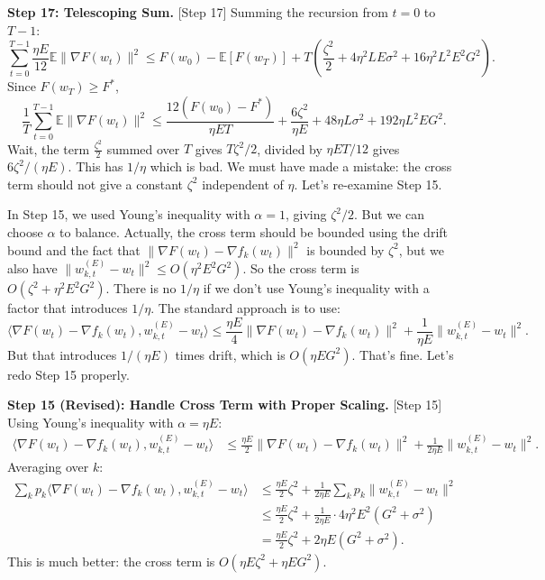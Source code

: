 \documentclass{article}
\begin{document}
\textbf{Step 17: Telescoping Sum.} [Step 17]
Summing the recursion from $t=0$ to $T-1$:
\begin{equation}
    \sum_{t=0}^{T-1} \frac{\eta E}{12} \mathbb{E} \| \nabla F(w_t) \|^2 \leq F(w_0) - \mathbb{E}[F(w_T)] + T \left( \frac{\zeta^2}{2} + 4 \eta^2 L E \sigma^2 + 16 \eta^2 L^2 E^2 G^2 \right).
\end{equation}
Since $F(w_T) \geq F^*$,
\begin{equation}
    \frac{1}{T} \sum_{t=0}^{T-1} \mathbb{E} \| \nabla F(w_t) \|^2 \leq \frac{12(F(w_0) - F^*)}{\eta E T} + \frac{6\zeta^2}{\eta E} + 48 \eta L \sigma^2 + 192 \eta L^2 E G^2.
\end{equation}
Wait, the term $\frac{\zeta^2}{2}$ summed over $T$ gives $T \zeta^2/2$, divided by $\eta E T/12$ gives $6\zeta^2/(\eta E)$. This has $1/\eta$ which is bad. We must have made a mistake: the cross term should not give a constant $\zeta^2$ independent of $\eta$. Let's re-examine Step 15.

In Step 15, we used Young's inequality with $\alpha=1$, giving $\zeta^2/2$. But we can choose $\alpha$ to balance. Actually, the cross term should be bounded using the drift bound and the fact that $\| \nabla F(w_t) - \nabla f_k(w_t) \|^2$ is bounded by $\zeta^2$, but we also have $\| w_{k,t}^{(E)} - w_t \|^2 \leq O(\eta^2 E^2 G^2)$. So the cross term is $O(\zeta^2 + \eta^2 E^2 G^2)$. There is no $1/\eta$ if we don't use Young's inequality with a factor that introduces $1/\eta$. The standard approach is to use:
\begin{equation}
    \langle \nabla F(w_t) - \nabla f_k(w_t), w_{k,t}^{(E)} - w_t \rangle \leq \frac{\eta E}{4} \| \nabla F(w_t) - \nabla f_k(w_t) \|^2 + \frac{1}{\eta E} \| w_{k,t}^{(E)} - w_t \|^2.
\end{equation}
But that introduces $1/(\eta E)$ times drift, which is $O(\eta E G^2)$. That's fine. Let's redo Step 15 properly.

\textbf{Step 15 (Revised): Handle Cross Term with Proper Scaling.} [Step 15]
Using Young's inequality with $\alpha = \eta E$:
\begin{align}
    \langle \nabla F(w_t) - \nabla f_k(w_t), w_{k,t}^{(E)} - w_t \rangle &\leq \frac{\eta E}{2} \| \nabla F(w_t) - \nabla f_k(w_t) \|^2 + \frac{1}{2\eta E} \| w_{k,t}^{(E)} - w_t \|^2.
\end{align}
Averaging over $k$:
\begin{align}
    \sum_k p_k \langle \nabla F(w_t) - \nabla f_k(w_t), w_{k,t}^{(E)} - w_t \rangle &\leq \frac{\eta E}{2} \zeta^2 + \frac{1}{2\eta E} \sum_k p_k \| w_{k,t}^{(E)} - w_t \|^2 \\
    &\leq \frac{\eta E}{2} \zeta^2 + \frac{1}{2\eta E} \cdot 4 \eta^2 E^2 (G^2 + \sigma^2) \\
    &= \frac{\eta E}{2} \zeta^2 + 2 \eta E (G^2 + \sigma^2).
\end{align}
This is much better: the cross term is $O(\eta E \zeta^2 + \eta E G^2)$.
\end{document}
